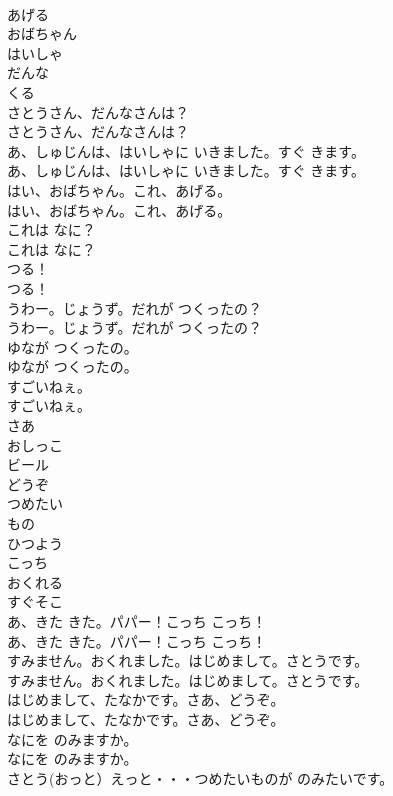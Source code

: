 \documentclass[8pt]{extreport}
\begin{document}
\begin{CJK}{UTF8}{min}
\\	あげる
\\	おばちゃん
\\	はいしゃ
\\	だんな
\\	くる
\\	さとうさん、だんなさんは？	
\\	さとうさん、だんなさんは？ 
\\	あ、しゅじんは、はいしゃに いきました。すぐ きます。	
\\	あ、しゅじんは、はいしゃに いきました。すぐ きます。 
\\	はい、おばちゃん。これ、あげる。	
\\	はい、おばちゃん。これ、あげる。 
\\	これは なに？	
\\	これは なに？ 
\\	つる！	
\\	つる！ 
\\	うわー。じょうず。だれが つくったの？	
\\	うわー。じょうず。だれが つくったの？ 
\\	ゆなが つくったの。	
\\	ゆなが つくったの。 
\\	すごいねぇ。	
\\	すごいねぇ。 
\\	さあ
\\	おしっこ
\\	ビール
\\	どうぞ
\\	つめたい
\\	もの
\\	ひつよう
\\	こっち
\\	おくれる
\\	すぐそこ
\\	あ、きた きた。パパー！こっち こっち！	
\\	あ、きた きた。パパー！こっち こっち！ 
\\	すみません。おくれました。はじめまして。さとうです。	
\\	すみません。おくれました。はじめまして。さとうです。 
\\	はじめまして、たなかです。さあ、どうぞ。	
\\	はじめまして、たなかです。さあ、どうぞ。 
\\	なにを のみますか。	
\\	なにを のみますか。 
\\	さとう(おっと）えっと・・・つめたいものが のみたいです。	

\end{CJK}
\end{document}
